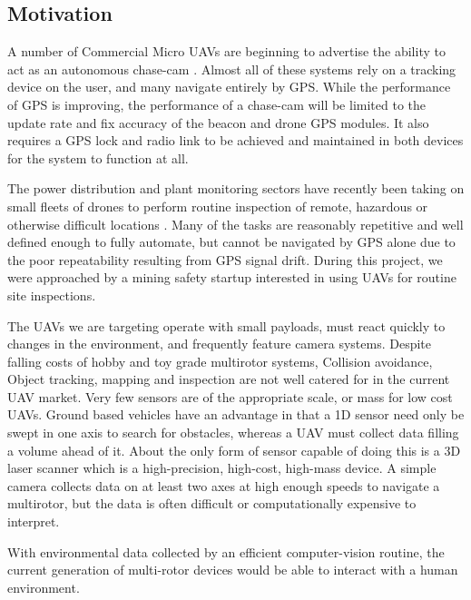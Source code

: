 \documentclass{article}
\begin{document}
    \subsection{Motivation}

      A number of Commercial Micro UAVs are beginning to advertise the ability to act as an autonomous chase-cam \cite{Lily} \cite{AirDog}.  Almost all of these systems rely on a tracking device on the user, and many navigate entirely by GPS.  While the performance of GPS is improving, the performance of a chase-cam will be limited to the update rate and fix accuracy of the beacon and drone GPS modules.  It also requires a GPS lock and radio link to be achieved and maintained in both devices for the system to function at all.

      The power distribution and plant monitoring sectors have recently been taking on small fleets of drones to perform routine inspection of remote, hazardous or otherwise difficult locations \cite{RopeAccess}.  Many of the tasks are reasonably repetitive and well defined enough to fully automate, but cannot be navigated by GPS alone due to the poor repeatability resulting from GPS signal drift.
      During this project, we were approached by a mining safety startup interested in using UAVs for routine site inspections.

      The UAVs we are targeting operate with small payloads, must react quickly to changes in the environment, and frequently feature camera systems.
      Despite falling costs of hobby and toy grade multirotor systems, Collision avoidance, Object tracking, mapping and inspection are not well catered for in the current UAV market.
      Very few sensors are of the appropriate scale, or mass for low cost UAVs.
      Ground based vehicles have an advantage in that a 1D sensor need only be swept in one axis to search for obstacles, whereas a UAV must collect data filling a volume ahead of it. About the only form of sensor capable of doing this is a 3D laser scanner which is a high-precision, high-cost, high-mass device.
      A simple camera collects data on at least two axes at high enough speeds to navigate a multirotor, but the data is often difficult or computationally expensive to interpret.

      With environmental data collected by an efficient computer-vision routine, the current generation of multi-rotor devices would be able to interact with a human environment.
\end{document}
